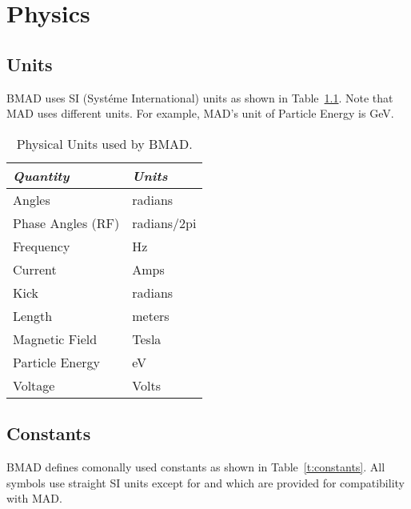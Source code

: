 \chapter{Physics}

\section{Units}

BMAD uses SI (Syst\'eme International) units as shown in
Table~\ref{t:units}.  Note that MAD uses different units. For example,
MAD's unit of Particle Energy is GeV.


\begin{table}
\begin{tabular}{|l|l|} \hline
  {\em Quantity}     & {\em Units}     \\ \hline
  Angles             &    radians      \\ 
  Phase Angles (RF)  &    radians/2pi  \\ 
  Frequency          &    Hz           \\ 
  Current            &    Amps         \\ 
  Kick               &    radians      \\ 
  Length             &    meters       \\ 
  Magnetic Field     &    Tesla        \\ 
  Particle Energy    &    eV           \\ 
  Voltage            &    Volts        \\ \hline
\end{tabular}
\caption{Physical Units used by BMAD.}
\label{t:units}
\end{table}


\section{Constants}

BMAD defines comonally used constants as shown in Table~\ref{t:constants}.
All symbols use straight SI units except for  and  which are provided for compatibility with MAD.

